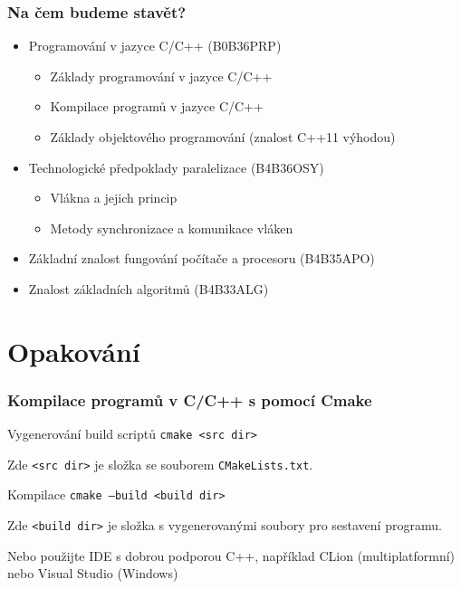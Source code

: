 \documentclass[usenames,dvipsnames,9pt]{beamer}
\begin{document}
\begin{frame}
  \frametitle{Na čem budeme stavět?}
  \begin{itemize}
    \item Programování v jazyce C/C++ {\small (B0B36PRP)}
          \begin{itemize}
            \item Základy programování v jazyce C/C++
            \item Kompilace programů v jazyce C/C++
            \item Základy objektového programování (znalost C++11 výhodou)
          \end{itemize}
    \pause
    \item Technologické předpoklady paralelizace {\small (B4B36OSY)}
          \begin{itemize}
            \item Vlákna a jejich princip
            \item Metody synchronizace a komunikace vláken
          \end{itemize}
    \pause
    \item Základní znalost fungování počítače a procesoru {\small (B4B35APO)}
    \pause
    \item Znalost základních algoritmů {\small (B4B33ALG)}
  \end{itemize}
\end{frame}

\section{Opakování}
\begin{frame}
  \frametitle{Kompilace programů v C/C++ s pomocí Cmake}
  \begin{block}{Vygenerování build scriptů}
    \texttt{cmake <src dir>}
  \end{block}
  Zde \texttt{<src dir>} je složka se souborem \texttt{CMakeLists.txt}.
  \vspace{1em}
  \begin{block}{Kompilace}
    \texttt{cmake --build <build dir>}
  \end{block}
  Zde \texttt{<build dir>} je složka s vygenerovanými soubory pro sestavení programu.

  Nebo použijte IDE s dobrou podporou C++, například CLion (multiplatformní) nebo Visual Studio (Windows)
\end{frame}
\end{document}
